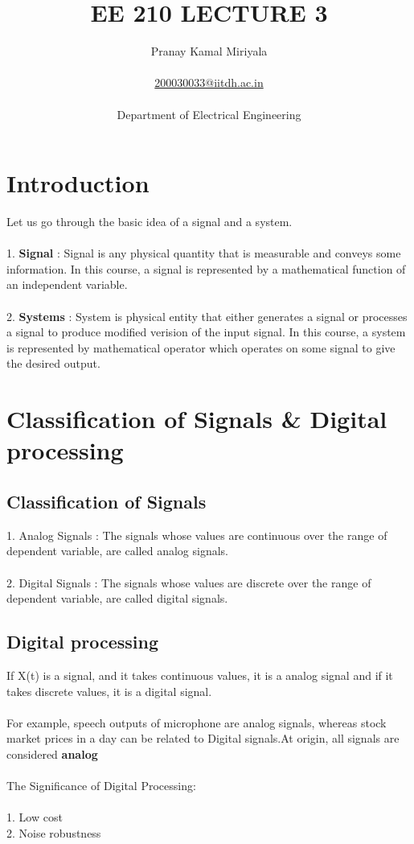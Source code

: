 \documentclass{article}
\title{EE 210 LECTURE 3}
\author{Pranay Kamal Miriyala\\\\\url{ 200030033@iitdh.ac.in}\\\\Department of Electrical Engineering}
\begin{document}
\maketitle

\newpage
\tableofcontents

\newpage

\section{Introduction}
Let us go through the basic idea of a signal and a system.\\\\
1. \textbf{Signal} : Signal is any physical quantity that is measurable and conveys some information. In this course, a signal is represented by a mathematical function of an independent variable.\\\\
2. \textbf{Systems} : System is physical entity that either generates a signal or processes a signal to produce modified verision of the input signal. In this course, a system is represented by mathematical operator which operates on some signal to give the desired output.

\section{Classification of Signals \& Digital processing}
\subsection{Classification of Signals}
1. Analog Signals : The signals whose values are continuous over the range of dependent variable, are called analog signals. \\\\
2. Digital Signals : The signals whose values are discrete over the range of dependent variable, are called digital signals.
\subsection{Digital processing}
If X(t) is a signal, and it takes continuous values, it is a analog signal and if it takes discrete values, it is a digital signal.\\\\For example, speech outputs of microphone are analog signals, whereas stock market prices in a day can be related to Digital signals.At origin, all signals are considered \textbf{analog}\\\\
The Significance of Digital Processing:\\\\
1. Low cost\\ 
2. Noise robustness\\
\end{document}
